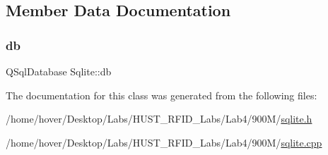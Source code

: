 \subsection{Member Data Documentation}
\mbox{\label{class_sqlite_afaaed0591ef0d92547dc5f049a22b3a6}} 
\subsubsection{\texorpdfstring{db}{db}}
{\footnotesize\ttfamily Q\+Sql\+Database Sqlite\+::db\hspace{0.3cm}{\ttfamily [private]}}



The documentation for this class was generated from the following files\+:\begin{DoxyCompactItemize}
\item 
/home/hover/\+Desktop/\+Labs/\+H\+U\+S\+T\+\_\+\+R\+F\+I\+D\+\_\+\+Labs/\+Lab4/900\+M/\mbox{\hyperlink{sqlite_8h}{sqlite.\+h}}\item 
/home/hover/\+Desktop/\+Labs/\+H\+U\+S\+T\+\_\+\+R\+F\+I\+D\+\_\+\+Labs/\+Lab4/900\+M/\mbox{\hyperlink{sqlite_8cpp}{sqlite.\+cpp}}\end{DoxyCompactItemize}
